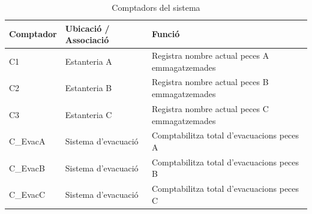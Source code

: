 \documentclass[a4paper,11pt,DIV=13,headings=normal,abstract=true,twoside=semi]{article}
\begin{document}
\begin{table}[H]
\centering
\small

\caption{Comptadors del sistema}
\label{tab:tab_comptadors}
\begin{tabular}{|p{2.5cm}|p{4cm}|p{7.5cm}|}
\hline
\textbf{Comptador} & \textbf{Ubicació / Associació} & \textbf{Funció} \\ \hline

C1 & Estanteria A & Registra nombre actual  peces  A emmagatzemades \\ \hline

C2 & Estanteria B & Registra  nombre actual  peces  B emmagatzemades \\ \hline

C3 & Estanteria C & Registra  nombre actual  peces  C emmagatzemades \\ \hline

C\_EvacA & Sistema d'evacuació & Comptabilitza total d'evacuacions peces A \\ \hline

C\_EvacB & Sistema d'evacuació & Comptabilitza total d'evacuacions peces B  \\ \hline

C\_EvacC & Sistema d'evacuació & Comptabilitza total d'evacuacions peces C  \\ \hline

\end{tabular}

\end{table}
\end{document}
